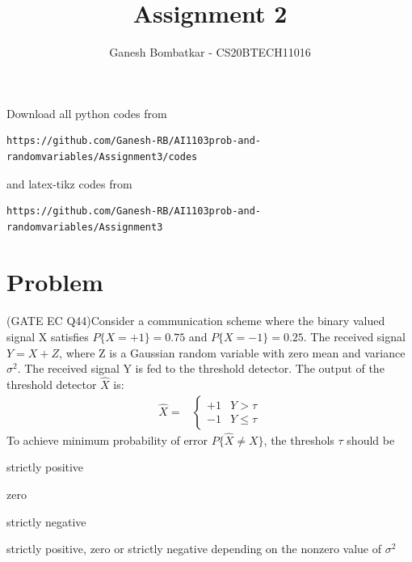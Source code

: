 \documentclass[journal,12pt,twocolumn]{IEEEtran}
\begin{document}
{\def\putbox#1#2#3{\makebox[0in][l]{\makebox[#1][l]{}\raisebox{\baselineskip}[0in][0in]{\raisebox{#2}[0in][0in]{#3}}}}
     \def\rightbox#1{\makebox[0in][r]{#1}}
     \def\centbox#1{\makebox[0in]{#1}}
     \def\topbox#1{\raisebox{-\baselineskip}[0in][0in]{#1}}
     \def\midbox#1{\raisebox{-0.5\baselineskip}[0in][0in]{#1}}
\vspace{3cm}
\title{Assignment 2}
\author{Ganesh Bombatkar - CS20BTECH11016}
\maketitle
\newpage
\bigskip
\renewcommand{\thefigure}{\theenumi}
\renewcommand{\thetable}{\theenumi}
Download all python codes from 
\begin{lstlisting}
https://github.com/Ganesh-RB/AI1103prob-and-randomvariables/Assignment3/codes
\end{lstlisting}
%
and latex-tikz codes from 
%
\begin{lstlisting}
https://github.com/Ganesh-RB/AI1103prob-and-randomvariables/Assignment3
\end{lstlisting}

\section{Problem}
(GATE EC Q44)Consider a communication scheme where the binary valued signal X satisfies $P\{X = +1\} = 0.75$ and $P\{X = -1\} = 0.25$. The received signal $Y = X+Z$, where Z is a Gaussian random variable with zero mean and variance $\sigma^2$. The received signal Y is fed to the threshold detector. The output of the threshold detector $\hat X$ is:
\begin{align}
\hat{X} =&
\begin{cases}
    +1 & Y> \tau \\
    -1 & Y \leqslant \tau
\end{cases}
\label{given_eqn}
 \end{align}
To achieve minimum probability of error $P\{\hat X \neq X\}$, the threshols $ \tau$ should be

\begin{enumerate}[]
\begin{multicols}{2}
\setlength\itemsep{0.1em}

\item strictly positive \label{option A}
\item zero \label{option B}
\item strictly negative \label{option C}
\item strictly positive, zero or strictly negative depending on the nonzero value of $\sigma ^2$ \label{option D}
\end{multicols}
\end{enumerate}

}
\end{document}
